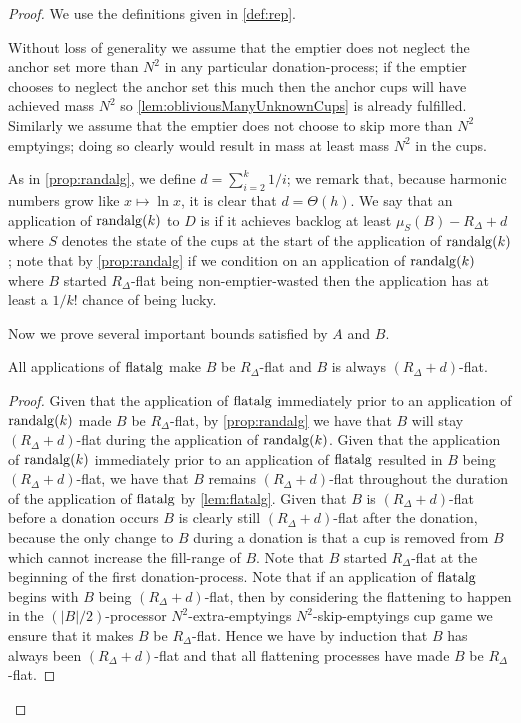 \begin{proof}
  We use the definitions given in \cref{def:rep}.

Without loss of generality we assume that the emptier does not
neglect the anchor set more than $N^2$ in any particular donation-process;
if the emptier chooses to neglect the anchor set this
much then the anchor cups will have achieved mass $N^2$ so
\cref{lem:obliviousManyUnknownCups} is already fulfilled. 
Similarly we assume that the emptier does not choose to skip
more than $N^2$ emptyings; doing so clearly would result in mass
at least mass $N^2$ in the cups.

As in \cref{prop:randalg}, we define $d =
\sum_{i=2}^{k} 1/i$; we remark that, because harmonic numbers
grow like $x\mapsto \ln x$, it is clear that $d=\Theta(h)$. We say that an
application of $\operatorname{\text{\textup{randalg}}}(k)$ to $D$ is  if it
achieves backlog at least $\mu_S(B) - R_\Delta + d$ where $S$
denotes the state of the cups at the start of the application of
$\operatorname{\text{\textup{randalg}}}(k)$; note that by
\cref{prop:randalg} if we condition on an
application of $\operatorname{\text{\textup{randalg}}}(k)$ where $B$ started $R_\Delta$-flat
being non-emptier-wasted then the application has at least a
$1/k!$ chance of being lucky.

Now we prove several important bounds satisfied by $A$ and $B$.
\begin{clm}
  \label{clm:allflatteningsworkbyM}
  All applications of $\operatorname{\text{\textup{flatalg}}}$ make $B$ be $R_\Delta$-flat and
  $B$ is always $(R_\Delta + d)$-flat.
\end{clm}
\begin{proof}
  Given that the application of $\operatorname{\text{\textup{flatalg}}}$ immediately prior to an application
  of $\operatorname{\text{\textup{randalg}}}(k)$ made $B$ be $R_\Delta$-flat, by
  \cref{prop:randalg} we have that $B$ will
  stay $(R_\Delta + d)$-flat during the application of $\operatorname{\text{\textup{randalg}}}(k)$. 
  Given that the application of $\operatorname{\text{\textup{randalg}}}(k)$ immediately prior to an
  application of $\operatorname{\text{\textup{flatalg}}}$ resulted in $B$ being $(R_\Delta
  + d)$-flat, we have that $B$ remains $(R_\Delta + d)$-flat
  throughout the duration of the application of $\operatorname{\text{\textup{flatalg}}}$ by
  \cref{lem:flatalg}. Given that $B$ is $(R_\Delta +
  d)$-flat before a donation occurs $B$ is clearly still $(R_\Delta +
  d)$-flat after the donation, because the only change to $B$ during
  a donation is that a cup is removed from $B$ which cannot increase
  the fill-range of $B$.
  Note that $B$ started $R_\Delta$-flat at the beginning of the
  first donation-process.
  Note that if an application of $\operatorname{\text{\textup{flatalg}}}$ begins with $B$ being
  $(R_\Delta + d)$-flat, then by considering the flattening to
  happen in the $(|B|/2)$-processor $N^2$-extra-emptyings
  $N^2$-skip-emptyings cup game we ensure that it makes $B$ be
  $R_\Delta$-flat.
  Hence we have by induction that $B$ has always been $(R_\Delta
  + d)$-flat and that all flattening processes have made $B$ be
  $R_\Delta$-flat. 
\end{proof}


\end{proof}

